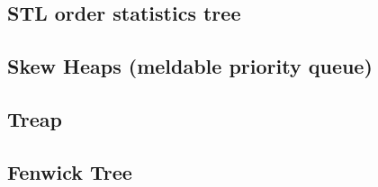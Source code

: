 %


%

\subsection{STL order statistics tree}


\subsection{Skew Heaps (meldable priority queue)}


\subsection{Treap}


\subsection{Fenwick Tree}


%

%
